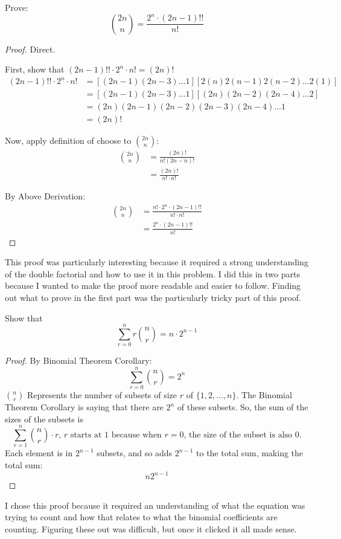 \documentclass[12pt]{article}
\begin{document}
Prove:
$$\binom{2n}{n} = \frac{2^n \cdot (2n-1)!!}{n!}$$
\begin{proof}
Direct.

First, show that $(2n-1)!! \cdot 2^n \cdot n! = (2n)!$
\begin{align*}
(2n-1)!! \cdot 2^n \cdot n! &= [(2n-1)(2n-3)...1][2(n)2(n-1)2(n-2)...2(1)]\\
&= [(2n-1)(2n-3)...1][(2n)(2n-2)(2n-4)...2]\\
&= (2n)(2n-1)(2n-2)(2n-3)(2n-4)...1\\
&= (2n)!
\end{align*}

Now, apply definition of choose to $\binom{2n}{n}$:
\begin{align*}
\binom{2n}{n} &= \frac{(2n)!}{n!(2n - n)!}\\
&= \frac{(2n)!}{n! \cdot n!}
\end{align*}

By Above Derivation:
\begin{align*}
\binom{2n}{n} &= \frac{n! \cdot 2^n \cdot (2n-1)!!}{n! \cdot n!}\\
&= \frac{2^n \cdot (2n-1)!!}{n!}
\end{align*}

\end{proof}

\par
This proof was particularly interesting because it required a strong understanding of the double factorial and how to use it in this problem. I did this in two parts because I wanted to make the proof more readable and easier to follow. Finding out what to prove in the first part was the particularly tricky part of this proof.

\newpage
Show that
$$\sum_{r=0}^n r \binom{n}{r} = n\cdot 2^{n-1}$$

\begin{proof}
By Binomial Theorem Corollary:
$$\sum_{r=0}^n \binom{n}{r}= 2^n$$
$\binom{n}{r}$ Represents the number of subsets of size $r$ of $\{ 1, 2, ..., n\}$. The Binomial Theorem Corollary is saying that there are $2^n$ of these subsets. So, the sum of the sizes of the subsets is
$$\sum_{r=1}^n\binom{n}{r}\cdot r\text{, }r\text{ starts at 1 because when }r=0\text{, the size of the subset is also 0.}$$
Each element is in $2^{n-1}$ subsets, and so adds $2^{n-1}$ to the total sum, making the total sum: 
$$n2^{n-1}$$
\end{proof}

\par
I chose this proof because it required an understanding of what the equation was trying to count and how that relates to what the binomial coefficients are counting. Figuring these out was difficult, but once it clicked it all made sense.
\end{document}

